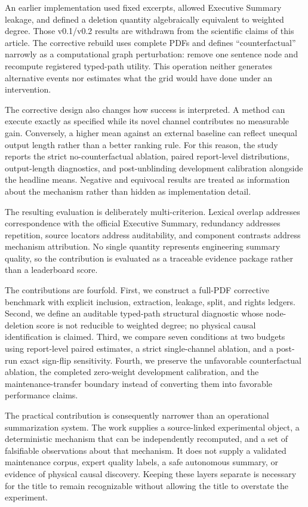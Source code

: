 \documentclass[applsci,article,submit,moreauthors]{Definitions/mdpi}
\begin{document}
An earlier implementation used fixed excerpts, allowed Executive Summary leakage, and defined a deletion quantity algebraically equivalent to weighted degree. Those v0.1/v0.2 results are withdrawn from the scientific claims of this article. The corrective rebuild uses complete PDFs and defines ``counterfactual'' narrowly as a computational graph perturbation: remove one sentence node and recompute registered typed-path utility. This operation neither generates alternative events nor estimates what the grid would have done under an intervention.

The corrective design also changes how success is interpreted. A method can execute exactly as specified while its novel channel contributes no measurable gain. Conversely, a higher mean against an external baseline can reflect unequal output length rather than a better ranking rule. For this reason, the study reports the strict no-counterfactual ablation, paired report-level distributions, output-length diagnostics, and post-unblinding development calibration alongside the headline means. Negative and equivocal results are treated as information about the mechanism rather than hidden as implementation detail.

The resulting evaluation is deliberately multi-criterion. Lexical overlap addresses correspondence with the official Executive Summary, redundancy addresses repetition, source locators address auditability, and component contrasts address mechanism attribution. No single quantity represents engineering summary quality, so the contribution is evaluated as a traceable evidence package rather than a leaderboard score.

The contributions are fourfold. First, we construct a full-PDF corrective benchmark with explicit inclusion, extraction, leakage, split, and rights ledgers. Second, we define an auditable typed-path structural diagnostic whose node-deletion score is not reducible to weighted degree; no physical causal identification is claimed. Third, we compare seven conditions at two budgets using report-level paired estimates, a strict single-channel ablation, and a post-run exact sign-flip sensitivity. Fourth, we preserve the unfavorable counterfactual ablation, the completed zero-weight development calibration, and the maintenance-transfer boundary instead of converting them into favorable performance claims.

The practical contribution is consequently narrower than an operational summarization system. The work supplies a source-linked experimental object, a deterministic mechanism that can be independently recomputed, and a set of falsifiable observations about that mechanism. It does not supply a validated maintenance corpus, expert quality labels, a safe autonomous summary, or evidence of physical causal discovery. Keeping these layers separate is necessary for the title to remain recognizable without allowing the title to overstate the experiment.
\end{document}
